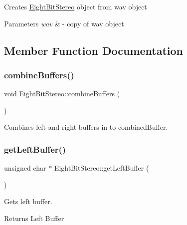 Creates \hyperlink{classEightBitStereo}{Eight\+Bit\+Stereo} object from wav object


\begin{DoxyParams}{Parameters}
{\em wav} & -\/ copy of wav object \\
\hline
\end{DoxyParams}


\subsection{Member Function Documentation}
\mbox{\label{classEightBitStereo_a2012cb731c4a6ead9afbcfe0309df589}} 
\subsubsection{\texorpdfstring{combine\+Buffers()}{combineBuffers()}}
{\footnotesize\ttfamily void Eight\+Bit\+Stereo\+::combine\+Buffers (\begin{DoxyParamCaption}{ }\end{DoxyParamCaption})}

Combines left and right buffers in to combined\+Buffer. \mbox{\label{classEightBitStereo_a02f9e38138558a3961a0e9ebae8777f8}} 
\subsubsection{\texorpdfstring{get\+Left\+Buffer()}{getLeftBuffer()}}
{\footnotesize\ttfamily unsigned char $\ast$ Eight\+Bit\+Stereo\+::get\+Left\+Buffer (\begin{DoxyParamCaption}{ }\end{DoxyParamCaption})}

Gets left buffer. \begin{DoxyReturn}{Returns}
Left Buffer 
\end{DoxyReturn}
\mbox{\label{classEightBitStereo_a261d17d0eea610c8929c5c2a814da8f5}} 

